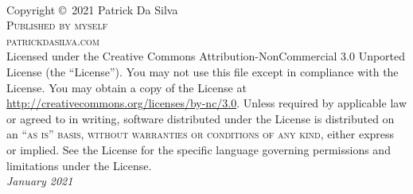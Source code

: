 
\begingroup
\thispagestyle{empty}
\vfill
\endgroup


\newpage
~\vfill
\thispagestyle{empty}

\noindent Copyright \copyright\ 2021 Patrick Da Silva\\ %

\noindent \textsc{Published by myself}\\ %

\noindent \textsc{patrickdasilva.com}\\ %

\noindent Licensed under the Creative Commons Attribution-NonCommercial 3.0 Unported License (the ``License''). You may not use this file except in compliance with the License. You may obtain a copy of the License at \url{http://creativecommons.org/licenses/by-nc/3.0}. Unless required by applicable law or agreed to in writing, software distributed under the License is distributed on an \textsc{``as is'' basis, without warranties or conditions of any kind}, either express or implied. See the License for the specific language governing permissions and limitations under the License.\\ %

\noindent \textit{January 2021} %

